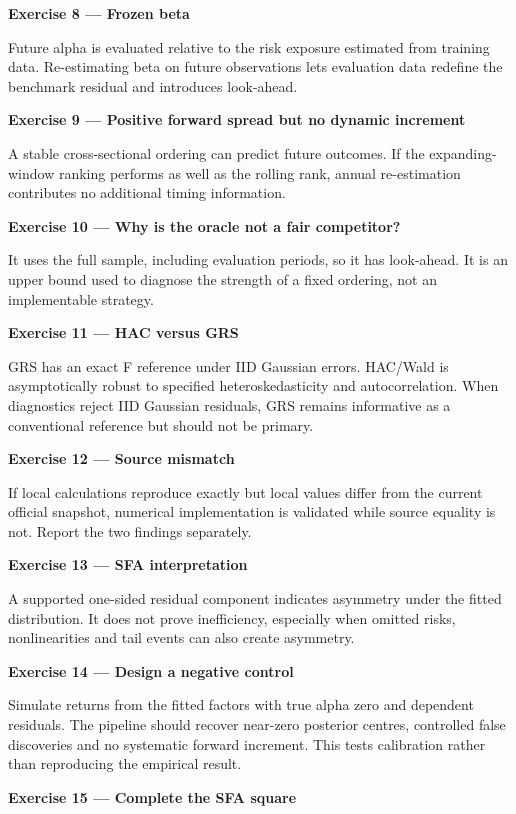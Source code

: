 \textbf{Exercise 8 --- Frozen beta}

Future alpha is evaluated relative to the risk exposure estimated from
training data. Re-estimating beta on future observations lets evaluation
data redefine the benchmark residual and introduces look-ahead.

\textbf{Exercise 9 --- Positive forward spread but no dynamic increment}

A stable cross-sectional ordering can predict future outcomes. If the
expanding-window ranking performs as well as the rolling rank, annual
re-estimation contributes no additional timing information.

\textbf{Exercise 10 --- Why is the oracle not a fair competitor?}

It uses the full sample, including evaluation periods, so it has
look-ahead. It is an upper bound used to diagnose the strength of a
fixed ordering, not an implementable strategy.

\textbf{Exercise 11 --- HAC versus GRS}

GRS has an exact F reference under IID Gaussian errors. HAC/Wald is
asymptotically robust to specified heteroskedasticity and
autocorrelation. When diagnostics reject IID Gaussian residuals, GRS
remains informative as a conventional reference but should not be
primary.

\textbf{Exercise 12 --- Source mismatch}

If local calculations reproduce exactly but local values differ from the
current official snapshot, numerical implementation is validated while
source equality is not. Report the two findings separately.

\textbf{Exercise 13 --- SFA interpretation}

A supported one-sided residual component indicates asymmetry under the
fitted distribution. It does not prove inefficiency, especially when
omitted risks, nonlinearities and tail events can also create asymmetry.

\textbf{Exercise 14 --- Design a negative control}

Simulate returns from the fitted factors with true alpha zero and
dependent residuals. The pipeline should recover near-zero posterior
centres, controlled false discoveries and no systematic forward
increment. This tests calibration rather than reproducing the empirical
result.

\textbf{Exercise 15 --- Complete the SFA square}


